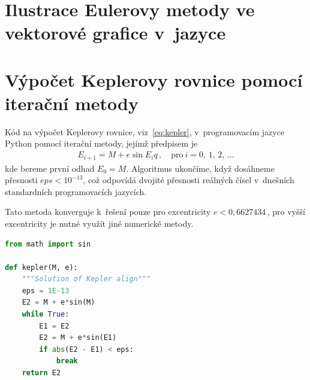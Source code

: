 \documentclass[A4paper, 12pt, oneside]{book}
\begin{document}
\printbibliography
\begin{appendices}
	\chapter{Ilustrace Eulerovy metody ve vektorové grafice v~jazyce } \label{app:asy}

	\begin{figure}[!htb]
	\centering
	\end{figure}

	

	\chapter{Výpočet Keplerovy rovnice pomocí iterační metody} \label{app:kepit}
	Kód na výpočet Keplerovy rovnice, viz~\eqref{eq:kepler}, v~programovacím jazyce Python pomocí iterační metody, jejímž předpisem je
	\begin{align*}
		E_{i+1}=M+e\sin{E_i}q\,, \quad \text{pro}\ i=0,\,1,\,2,\,\ldots
	\end{align*}
	kde bereme první odhad $E_0=M$. Algoritmus ukončíme, když dosáhneme přesnosti ${eps<10^{-13}}$, což odpovídá dvojité přesnosti reálných čísel v~dnešních standardních programovacích jazycích.

	Tato metoda konverguje k~řešení pouze pro excentricity $e<0,6627434\,$, pro vyšší excentricity je nutné využít jiné numerické metody.
\begin{lstlisting}[language=Python]
from math import sin

def kepler(M, e):
    """Solution of Kepler align"""
    eps = 1E-13
    E2 = M + e*sin(M)
    while True:
        E1 = E2
        E2 = M + e*sin(E1)
        if abs(E2 - E1) < eps:
            break 
    return E2
\end{lstlisting}

\end{appendices}
\end{document}
